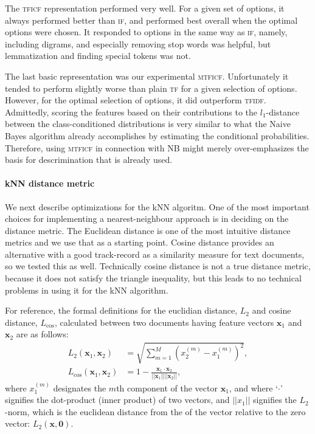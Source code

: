 \documentclass[conference,letterpaper]{IEEEtran}
\begin{document}
The \textsc{tficf} representation performed very well.  For a given set of 
options, it always performed better than \textsc{if}, and performed best 
overall when the optimal options were chosen.  It responded to options in the 
same
way as \textsc{if}, namely, including digrams, and especially removing stop
words was helpful, but lemmatization and finding special tokens was not.

The last basic representation was our experimental \textsc{mtficf}.  
Unfortunately it tended to perform slightly worse than plain \textsc{tf} for
a given selection of options.  However, for the optimal selection of options,
it did outperform \textsc{tfidf}.  Admittedly, scoring the 
features based on their contributions to the $l_1$-distance between the 
class-conditioned distributions is very similar to what the Naive Bayes 
algorithm already accomplishes by estimating the conditional probabilities.
Therefore, using \textsc{mtficf} in connection with NB might merely 
over-emphasizes the basis for descrimination that is already used.


\paragraph*{kNN distance metric}
We next describe optimizations for the kNN algoritm.  One of the most important
choices for implementing a nearest-neighbour approach is in deciding
on the distance metric.  The Euclidean distance is one of the most intuitive
distance metrics and we use that as a starting point.
Cosine distance provides an alternative with a good track-record as a 
similarity measure for text documents, so we tested this as well.  
Technically cosine distance is not
a true distance metric, because it does not satisfy the triangle inequality,
but this leads to no technical problems in using it for the kNN algorithm.


For reference, the formal definitions for the euclidian distance, $L_2$ and
cosine distance, $L_\mathrm{cos}$, calculated between two documents having 
feature vectors $\mathbf{x}_1$ and $\mathbf{x}_2$ are as follows:
\begin{align}
	L_2(\mathbf{x}_1, \mathbf{x}_2) 
		&= \sqrt{\sum_{m=1}^M (x_2^{(m)} - x_1^{(m)})^2}, \\
	L_\mathrm{cos}(\mathbf{x}_1, \mathbf{x}_2) 
		&= 1 - \frac{\mathbf{x}_1 \cdot \mathbf{x}_2}
			{||\mathbf{x}_1|| ||\mathbf{x}_2||},
\end{align}
where $x_1^{(m)}$ designates the $m$th component of the vector $\mathbf{x}_1$,
and where `$\cdot$' signifies the dot-product (inner product) of two vectors,
and $||x_1||$ signifies the $L_2$-norm, which is the euclidean distance from
the of the vector relative to the zero vector: $L_2(\mathbf{x}, \mathbf{0})$.
\end{document}
